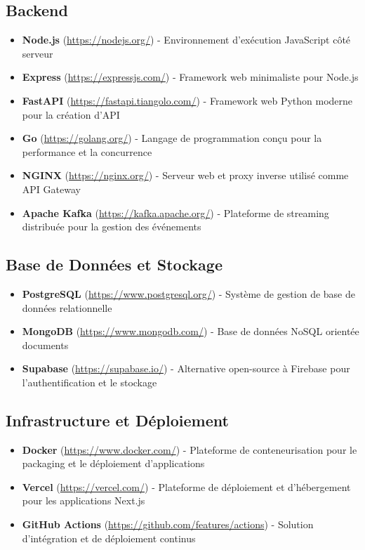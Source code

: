 \documentclass[12pt, a4paper]{report}
\begin{document}
\subsection{Backend}
\begin{itemize}
  \item \textbf{Node.js} (\url{https://nodejs.org/}) - Environnement d'exécution JavaScript côté serveur
  \item \textbf{Express} (\url{https://expressjs.com/}) - Framework web minimaliste pour Node.js
  \item \textbf{FastAPI} (\url{https://fastapi.tiangolo.com/}) - Framework web Python moderne pour la création d'API
  \item \textbf{Go} (\url{https://golang.org/}) - Langage de programmation conçu pour la performance et la concurrence
  \item \textbf{NGINX} (\url{https://nginx.org/}) - Serveur web et proxy inverse utilisé comme API Gateway
  \item \textbf{Apache Kafka} (\url{https://kafka.apache.org/}) - Plateforme de streaming distribuée pour la gestion des événements
\end{itemize}

\subsection{Base de Données et Stockage}
\begin{itemize}
  \item \textbf{PostgreSQL} (\url{https://www.postgresql.org/}) - Système de gestion de base de données relationnelle
  \item \textbf{MongoDB} (\url{https://www.mongodb.com/}) - Base de données NoSQL orientée documents
  \item \textbf{Supabase} (\url{https://supabase.io/}) - Alternative open-source à Firebase pour l'authentification et le stockage
\end{itemize}

\subsection{Infrastructure et Déploiement}
\begin{itemize}
  \item \textbf{Docker} (\url{https://www.docker.com/}) - Plateforme de conteneurisation pour le packaging et le déploiement d'applications
  \item \textbf{Vercel} (\url{https://vercel.com/}) - Plateforme de déploiement et d'hébergement pour les applications Next.js
  \item \textbf{GitHub Actions} (\url{https://github.com/features/actions}) - Solution d'intégration et de déploiement continus
\end{itemize}
\end{document}
